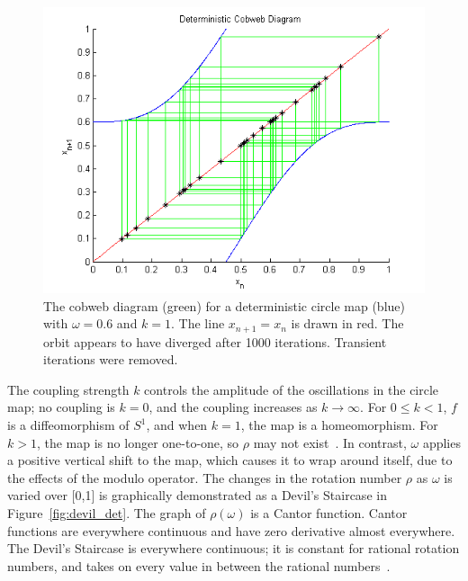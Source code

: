 \begin{figure}[!h]
\caption[Deterministic circle map, unstable orbit]{The cobweb
  diagram (green) for a deterministic circle map (blue) with $\omega =
  0.6$ and $k=1$. The line $x_{n+1}=x_n$ is drawn in red. The orbit
  appears to have diverged after 1000 iterations. Transient iterations were removed.}\label{fig:rcircunstable}
	\begin{center}
		\includegraphics[scale=0.7]{figs/detcirc_cobweb_chaos.png}
	\end{center}
\end{figure}
The coupling strength $k$
controls the amplitude of the oscillations in the circle map; no
coupling is $k=0$, and the coupling increases as $k \to
\infty$. For $0 \leq k < 1$, $f$ is a diffeomorphism of $S^1$, and
when $k=1$, the map is a homeomorphism. For $k>1$, the map is no
longer one-to-one, so $\rho$ may not exist~\cite{devaney}. In contrast, $\omega$
applies a positive vertical shift to the map, which causes it to wrap around itself, due to the effects of the modulo operator. The changes in the rotation number $\rho$ as $\omega$ is
varied over [0,1] is graphically demonstrated as a Devil's Staircase
in Figure~\ref{fig:devil_det}. The graph of $\rho(\omega)$ is a Cantor
function. Cantor functions are everywhere continuous and have zero
derivative almost everywhere. The Devil's Staircase is everywhere
continuous; it is constant for
rational rotation numbers, and takes on every value in between the
rational numbers~\cite{devaney}.
